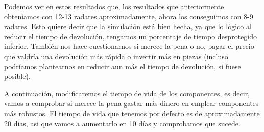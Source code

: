 \documentclass[11pt,a4paper]{report}
\begin{document}
\begin{table}[H]
\centering
{}
\end{table}

Podemos ver en estos resultados que, los resultados que anteriormente obteníamos con 12-13 radares aproximadamente, ahora los conseguimos
con 8-9 radares. Esto quiere decir que la simulación está bien hecha, ya que lo lógico al reducir el tiempo de devolución, tengamos un
porcentaje de tiempo desprotegido inferior. También nos hace cuestionarnos si merece la pena o no, pagar el precio que valdría una devolución
más rápida o invertir más en piezas (incluso podríamos plantearnos en reducir aun más el tiempo de devolución, si fuese posible).

A continuación, modificaremos el tiempo de vida de los componentes, es decir, vamos a comprobar si merece la pena gastar más dinero en
emplear componentes más robustos. El tiempo de vida que tenemos por defecto es de aproximadamente 20 días, asi que vamos a aumentarlo en
10 días y comprobamos que sucede.
\end{document}
